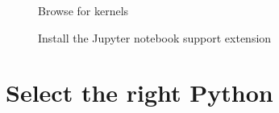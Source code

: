 \documentclass[
  letterpaper,
  DIV=11,
  numbers=noendperiod]{scrreprt}
\begin{document}
\begin{figure}


\caption{\label{fig-4}Browse for kernels}

\end{figure}%

\begin{figure}


\caption{\label{fig-5}Install the Jupyter notebook support extension}

\end{figure}%

\section*{Select the right Python}\label{select-the-right-python}
\end{document}
